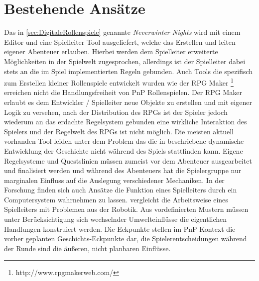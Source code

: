 \section{Bestehende Ansätze}
\label{sec:BekannteAnsaetze}

Das in \ref{sec:DigitaleRollenspiele} genannte \emph{Neverwinter Nights} wird mit einem Editor und eine Spielleiter Tool ausgeliefert, welche das Erstellen und leiten eigener Abenteuer erlauben. Hierbei werden dem Spielleiter erweiterte Möglichkeiten in der Spielwelt zugesprochen, allerdings ist der Spielleiter dabei stets an die im Spiel implementierten Regeln gebunden. \cite{Tychsen2006a}\newline
Auch Tools die spezifisch zum Erstellen kleiner Rollenspiele entwickelt wurden wie der RPG Maker \footnote{http://www.rpgmakerweb.com/} erreichen nicht die Handlungsfreiheit von PnP Rollenspielen. Der RPG Maker erlaubt es dem Entwickler / Spielleiter neue Objekte zu erstellen und mit eigener Logik zu versehen, nach der Distribution des RPGs ist der Spieler jedoch wiederum an das erdachte Regelsystem gebunden eine wirkliche Interaktion des Spielers und der Regelwelt des RPGs ist nicht möglich.\newline
Die meisten aktuell vorhanden Tool leiden unter dem Problem das die in \cite{Arinbjarnar} beschriebene dynamische Entwicklung der Geschichte nicht während des Spiels stattfinden kann. Eigene Regelsysteme und Questslinien müssen zumeist vor dem Abenteuer ausgearbeitet und finalisiert werden und während des Abenteuers hat die Spielergruppe nur marginalen Einfluss auf die Auslegung verschiedener Mechaniken.\newline
In der Forschung finden sich auch Ansätze die Funktion eines Spielleiters durch ein Computersystem wahrnehmen zu lassen. \cite{Aylett2007} vergleicht die Arbeitsweise eines Spielleiters mit Problemen aus der Robotik. Aus vordefinierten Mustern müssen unter Berücksichtigung sich wechselnder Umwelteinflüsse die eigentlichen Handlungen konstruiert werden. Die Eckpunkte stellen im PnP Kontext die vorher geplanten Geschichts-Eckpunkte dar, die Spielerentscheidungen während der Runde sind die äußeren, nicht planbaren Einflüsse.\newline
